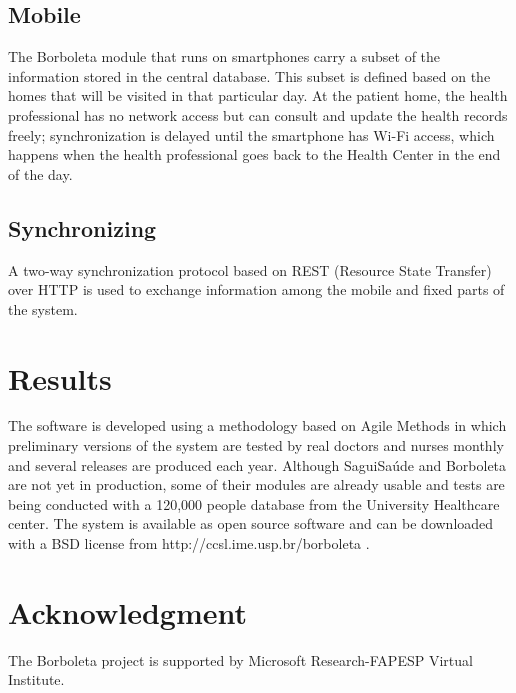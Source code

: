 \documentclass[12pt]{article}
\begin{document}
\subsection{Mobile}
The Borboleta module 
\cite{borboleta} that runs on smartphones carry a subset of the information stored in the central database. This subset is defined based on the homes that will be visited in that particular day. At the patient home, the health professional has no network access but can consult and update the health records freely; synchronization is delayed until the smartphone has Wi-Fi access, which happens when the health professional goes back to the Health Center in the end of the day. 

\subsection{Synchronizing}
A two-way synchronization protocol based on REST (Resource State Transfer) over HTTP is used to exchange information among the mobile and fixed parts of the system.




\section{Results}
The software is developed using a methodology based on Agile Methods in which preliminary versions of the system are tested by real doctors and nurses monthly and several releases are produced each year. Although SaguiSaúde and Borboleta are not yet in production, some of their modules are already usable and tests are being conducted with a 120,000 people database from the University Healthcare center. The system is available as open source software and can be downloaded with a BSD license from http://ccsl.ime.usp.br/borboleta .

\section{Acknowledgment}
The Borboleta project is supported by Microsoft Research-FAPESP Virtual Institute.



\end{document}
